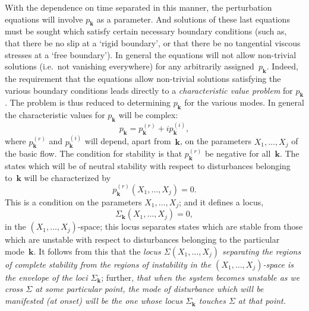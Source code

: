 With the dependence on time separated in this manner, the perturbation equations will involve $p_{\mathbf{k}}$ as a parameter.  And solutions of these last
equations must be sought which satisfy certain necessary boundary
conditions (such as, that there be no slip at a `rigid boundary', or that
there be no tangential viscous stresses at a `free boundary').  In general
the equations will not allow non-trivial solutions (i.e.\ not vanishing
everywhere) for any arbitrarily assigned~$p_{\mathbf{k}}$.  Indeed, the requirement
that the equations allow non-trivial solutions satisfying the various
boundary conditions leads directly to a \emph{characteristic value problem} for
$p_{\mathbf{k}}$.  The problem is thus reduced to determining $p_{\mathbf{k}}$ for the various modes.
In general the characteristic values for $p_{\mathbf{k}}$ will be complex:
\begin{equation}
\label{eq:1-8}
p_{\mathbf{k}} = p_{\mathbf{k}}^{(r)} + i p_{\mathbf{k}}^{(i)},
\end{equation}
where $p_{\mathbf{k}}^{(r)}$ and $p_{\mathbf{k}}^{(i)}$ will depend, apart from~$\mathbf{k}$, on the parameters $X_1, \ldots, X_j$
of the basic flow.  The condition for stability is that $p_{\mathbf{k}}^{(r)}$ be negative for
all~$\mathbf{k}$.  The states which will be of neutral stability with respect to
disturbances belonging to~$\mathbf{k}$ will be characterized by
\begin{equation}
\label{eq:1-9}
p_{\mathbf{k}}^{(r)}(X_1, \ldots, X_j) = 0.
\end{equation}
This is a condition on the parameters $X_1, \ldots, X_j$; and it defines a locus,
\begin{equation}
\label{eq:1-10}
\Sigma_{\mathbf{k}}(X_1, \ldots, X_j) = 0,
\end{equation}
in the $(X_1, \ldots, X_j)$-space; this locus separates states which are stable
from those which are unstable with respect to disturbances belonging
to the particular mode~$\mathbf{k}$.  It follows from this that the \emph{locus $\Sigma(X_1, \ldots, X_j)$
separating the regions of complete stability from the regions of instability
in the $(X_1, \ldots, X_j)$-space is the envelope of the loci $\Sigma_{\mathbf{k}}$}; further, \emph{that when the
system becomes unstable as we cross $\Sigma$ at some particular point, the mode
of disturbance which will be manifested (at onset) will be the one whose
locus $\Sigma_{\mathbf{k}}$ touches $\Sigma$ at that point.}

